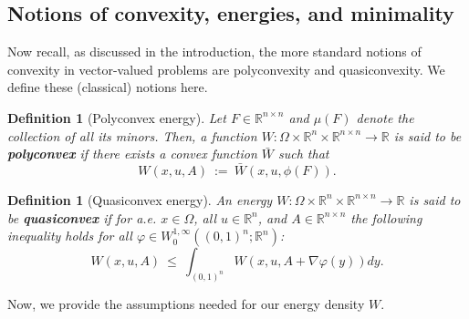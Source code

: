 \documentclass[11pt, reqno]{amsart}   	%
\theoremstyle{plain}
\numberwithin{equation}{section}
\newtheorem{definition}[thm]{Definition}
\def\Om{\Omega}
\def\vphi{\varphi}
\def\R{\mathbb{R}}
\def\grad{\nabla}
\begin{document}

\subsection{Notions of convexity, energies, and minimality}\label{Subsec: energy}



Now recall, as discussed in the introduction, the more standard notions of convexity in vector-valued problems are polyconvexity and quasiconvexity. We define these (classical) notions here.

\begin{definition}[Polyconvex energy]\label{Def: pConvexEnergy}
		Let $F\in \R^{n\times n}$ and $\mu(F)$ denote the collection of all its minors. Then, a function $W: \Om \times \R^n \times \R^{n \times n} \rightarrow \R$ is said to be \textbf{polyconvex} if there exists a convex function $\bar{W}$ such that
		\begin{equation}\label{eq: pConvexEnergy}
			W(x, u, A) \ := \ \bar{W}(x,u,\phi(F)).
		\end{equation}
	\end{definition}

    \begin{definition}[Quasiconvex energy]\label{Def: qConvexEnergy}
		An energy $W: \Om \times \R^n \times \R^{n \times n} \rightarrow \R$ is said to be \textbf{quasiconvex} if for a.e. $x \in \Om$, all $u \in \R^n$, and $A \in \R^{n \times n}$ the following inequality holds for all $\vphi \in W^{1, \infty}_0((0, 1)^n; \R^n)$:
		\begin{equation}\label{eq: qConvexEnergy}
			W(x, u, A) \ \leq \ \int_{(0, 1)^n}W(x, u, A + \grad \vphi(y))dy.
		\end{equation}
	\end{definition}

   Now, we provide the assumptions needed for our energy density $W$.
\end{document}
